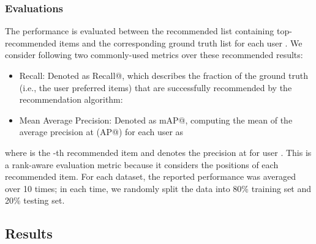 \documentclass[sigconf,anonymous=false]{acmart}
\begin{document}
\subsubsection{Evaluations}
The performance is evaluated between the recommended list  containing
top- recommended items and the corresponding ground truth list  for
each user . We consider following two commonly-used metrics over these 
recommended results:
\begin{itemize}
    \item Recall: Denoted as Recall@, which describes the fraction of the
        ground truth (i.e., the user preferred items) that are successfully
        recommended by the recommendation algorithm:
        
    \item Mean Average Precision: Denoted as mAP@, computing the mean of the
      average precision at  (AP@) for each user  as
        
\end{itemize}
where  is the -th recommended item and  denotes the
precision at  for user .
This is a rank-aware evaluation metric because it considers the positions of
each recommended item. 
For each dataset, the reported performance was averaged over 10 times; in each
time, we randomly split the data into 80\% training set and 20\% testing set.



\subsection{Results}
\end{document}
